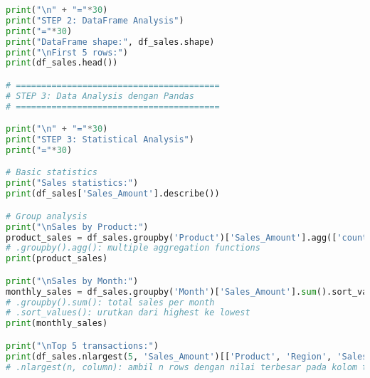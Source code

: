 \begin{lstlisting}[language=python, caption={Contoh Analisis Data Sales Lengkap}, style=python]
print("\n" + "="*30)
print("STEP 2: DataFrame Analysis")
print("="*30)
print("DataFrame shape:", df_sales.shape)
print("\nFirst 5 rows:")
print(df_sales.head())

# ========================================
# STEP 3: Data Analysis dengan Pandas
# ========================================

print("\n" + "="*30)
print("STEP 3: Statistical Analysis")
print("="*30)

# Basic statistics
print("Sales statistics:")
print(df_sales['Sales_Amount'].describe())

# Group analysis
print("\nSales by Product:")
product_sales = df_sales.groupby('Product')['Sales_Amount'].agg(['count', 'mean', 'sum'])
# .groupby().agg(): multiple aggregation functions
print(product_sales)

print("\nSales by Month:")
monthly_sales = df_sales.groupby('Month')['Sales_Amount'].sum().sort_values(ascending=False)
# .groupby().sum(): total sales per month
# .sort_values(): urutkan dari highest ke lowest
print(monthly_sales)

print("\nTop 5 transactions:")
print(df_sales.nlargest(5, 'Sales_Amount')[['Product', 'Region', 'Sales_Amount']])
# .nlargest(n, column): ambil n rows dengan nilai terbesar pada kolom tertentu
\end{lstlisting}

